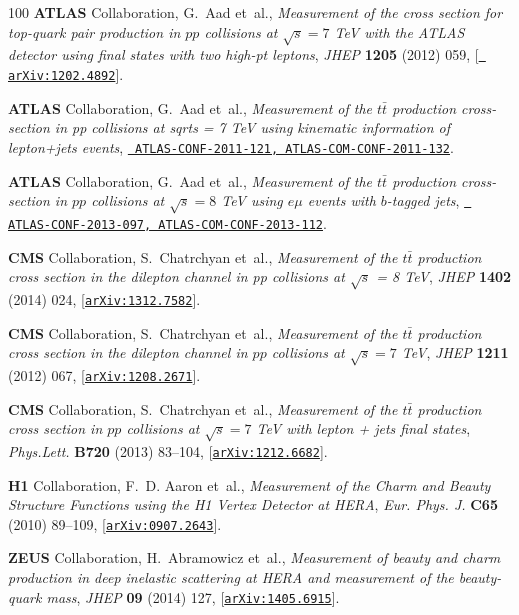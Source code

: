 \begin{thebibliography}{100}
{\bf ATLAS} Collaboration, G.~Aad et~al., {\it {Measurement of the cross
  section for top-quark pair production in $pp$ collisions at $\sqrt{s}=7$ TeV
  with the ATLAS detector using final states with two high-pt leptons}},  {\em
  JHEP} {\bf 1205} (2012) 059, [\href{http://arxiv.org/abs/1202.4892}{{\tt
  arXiv:1202.4892}}].

{\bf ATLAS} Collaboration, G.~Aad et~al., {\it {Measurement of the $t\bar{t}$
  production cross-section in pp collisions at sqrt{s} = 7 TeV using kinematic
  information of lepton+jets events}},
  \href{http://arxiv.org/abs/ATLAS-CONF-2011-121, ATLAS-COM-CONF-2011-132}{{\tt
  ATLAS-CONF-2011-121, ATLAS-COM-CONF-2011-132}}.

{\bf ATLAS} Collaboration, G.~Aad et~al., {\it {Measurement of the $t\bar{t}$
  production cross-section in $pp$ collisions at $\sqrt{s}=8$ TeV using $e\mu$
  events with $b$-tagged jets}},
  \href{http://arxiv.org/abs/ATLAS-CONF-2013-097, ATLAS-COM-CONF-2013-112}{{\tt
  ATLAS-CONF-2013-097, ATLAS-COM-CONF-2013-112}}.

{\bf CMS} Collaboration, S.~Chatrchyan et~al., {\it {Measurement of the $t
  \bar{t}$ production cross section in the dilepton channel in pp collisions at
  $\sqrt{s}$ = 8 TeV}},  {\em JHEP} {\bf 1402} (2014) 024,
  [\href{http://arxiv.org/abs/1312.7582}{{\tt arXiv:1312.7582}}].

{\bf CMS} Collaboration, S.~Chatrchyan et~al., {\it {Measurement of the
  $t\bar{t}$ production cross section in the dilepton channel in $pp$
  collisions at $\sqrt{s}=7$ TeV}},  {\em JHEP} {\bf 1211} (2012) 067,
  [\href{http://arxiv.org/abs/1208.2671}{{\tt arXiv:1208.2671}}].

{\bf CMS} Collaboration, S.~Chatrchyan et~al., {\it {Measurement of the
  $t\bar{t}$ production cross section in $pp$ collisions at $\sqrt{s}=7$ TeV
  with lepton + jets final states}},  {\em Phys.Lett.} {\bf B720} (2013)
  83--104, [\href{http://arxiv.org/abs/1212.6682}{{\tt arXiv:1212.6682}}].

{\bf H1} Collaboration, F.~D. Aaron et~al., {\it {Measurement of the Charm and
  Beauty Structure Functions using the H1 Vertex Detector at HERA}},  {\em Eur.
  Phys. J.} {\bf C65} (2010) 89--109,
  [\href{http://arxiv.org/abs/0907.2643}{{\tt arXiv:0907.2643}}].

{\bf ZEUS} Collaboration, H.~Abramowicz et~al., {\it {Measurement of beauty and
  charm production in deep inelastic scattering at HERA and measurement of the
  beauty-quark mass}},  {\em JHEP} {\bf 09} (2014) 127,
  [\href{http://arxiv.org/abs/1405.6915}{{\tt arXiv:1405.6915}}].


\end{thebibliography}
